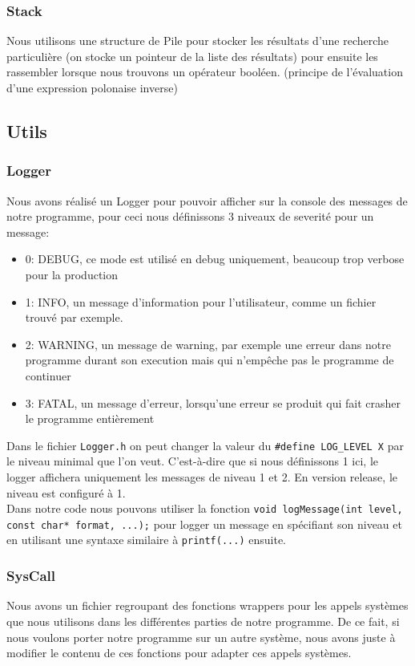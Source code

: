\documentclass[a4paper]{article}
\begin{document}
\subsubsection{Stack}
Nous utilisons une structure de Pile pour stocker les résultats d'une recherche particulière (on stocke un pointeur de la liste des résultats) pour ensuite les rassembler lorsque nous trouvons un opérateur booléen. (principe de l'évaluation d'une expression polonaise inverse)
\newpage
\subsection{Utils}
\subsubsection{Logger}
Nous avons réalisé un Logger pour pouvoir afficher sur la console des messages de notre programme, pour ceci nous définissons 3 niveaux de severité pour un message:
\begin{itemize}
	\item 0: DEBUG, ce mode est utilisé en debug uniquement, beaucoup trop verbose pour la production
	\item 1: INFO, un message d'information pour l'utilisateur, comme un fichier trouvé par exemple.
	\item 2: WARNING, un message de warning, par exemple une erreur dans notre programme durant son execution mais qui n'empêche pas le programme de continuer
	\item 3: FATAL, un message d'erreur, lorsqu'une erreur se produit qui fait crasher le programme entièrement
\end{itemize}
Dans le fichier \verb+Logger.h+ on peut changer la valeur du \verb+#define LOG_LEVEL X+ par le niveau minimal que l'on veut. C'est-à-dire que si nous définissons 1 ici, le logger affichera uniquement les messages de niveau 1 et 2. En version release, le niveau est configuré à 1.\\

Dans notre code nous pouvons utiliser la fonction \verb+void logMessage(int level, const char* format, ...);+ pour logger un message en spécifiant son niveau et en utilisant une syntaxe similaire à \verb+printf(...)+ ensuite.
\subsubsection{SysCall}
Nous avons un fichier regroupant des fonctions wrappers pour les appels systèmes que nous utilisons dans les différentes parties de notre programme. De ce fait, si nous voulons porter notre programme sur un autre système, nous avons juste à modifier le contenu de ces fonctions pour adapter ces appels systèmes. \\
\end{document}
